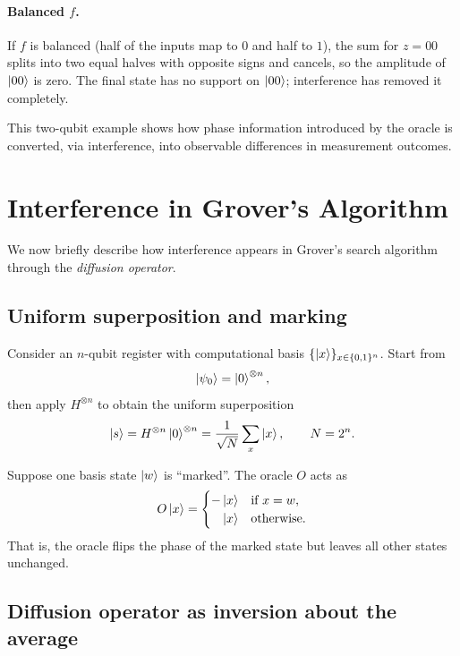 \documentclass[a4paper,11pt]{article}
\providecommand{\ket}[1]{\mathinner{|{#1}\rangle}}
\begin{document}
\paragraph{Balanced $f$.}
If $f$ is balanced (half of the inputs map to $0$ and half to $1$), the sum for $z = 00$ splits into
two equal halves with opposite signs and cancels, so the amplitude of $\ket{00}$ is zero. The final
state has no support on $\ket{00}$; interference has removed it completely.

This two-qubit example shows how phase information introduced by the oracle is converted, via
interference, into observable differences in measurement outcomes.

\section*{Interference in Grover's Algorithm}

We now briefly describe how interference appears in Grover's search algorithm through the
\emph{diffusion operator}.

\subsection*{Uniform superposition and marking}

Consider an $n$-qubit register with computational basis $\{\ket{x}\}_{x \in \{0,1\}^n}$. Start from
\begin{equation}
  \ket{\psi_0} = \ket{0}^{\otimes n},
\end{equation}
then apply $H^{\otimes n}$ to obtain the uniform superposition
\begin{equation}
  \ket{s} = H^{\otimes n}\ket{0}^{\otimes n} = \frac{1}{\sqrt{N}}\sum_{x}\ket{x},
  \qquad N = 2^n.
\end{equation}

Suppose one basis state $\ket{w}$ is ``marked''. The oracle $O$ acts as
\begin{equation}
  O\ket{x} =
  \begin{cases}
    -\ket{x} & \text{if } x = w, \\
    \phantom{-}\ket{x} & \text{otherwise.}
  \end{cases}
\end{equation}
That is, the oracle flips the phase of the marked state but leaves all other states unchanged.

\subsection*{Diffusion operator as inversion about the average}
\end{document}
